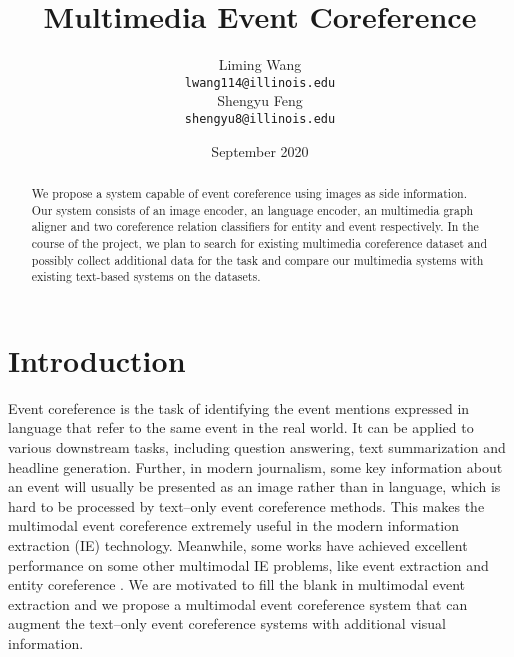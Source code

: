 \documentclass[11pt,a4paper]{article}
\title{Multimedia Event Coreference}
\author{Liming Wang\\
\texttt{lwang114@illinois.edu}\\\And
Shengyu Feng\\
\texttt{shengyu8@illinois.edu}\\
}
\date{September 2020}
\newcommand{\bx}{\mathbf{x}}
\newcommand{\cD}{\mathcal{D}}
\begin{document}
\maketitle

\begin{abstract}
We propose a system capable of event coreference using images as side information. Our system consists of an image encoder, an language encoder, an multimedia graph aligner and two coreference relation classifiers for entity and event respectively. In the course of the project, we plan to search for existing multimedia coreference dataset and possibly collect additional data for the task and compare our multimedia systems with existing text-based systems on the datasets.  
\end{abstract}

\section{Introduction}
Event coreference is the task of identifying the event mentions expressed in language that refer to the same event in the real world. It can be applied to various downstream tasks, including question answering, text summarization and headline generation. Further, in modern journalism, some key information about an event will usually be presented as an image rather than in language, which is hard to be processed by text--only event coreference methods. This makes the multimodal event coreference extremely useful in the modern information extraction (IE) technology. Meanwhile, some works have achieved excellent performance on some other multimodal IE problems, like event extraction and entity coreference \cite{Li2020-crossmedia-ie}. We are motivated to fill the blank in multimodal event extraction and we propose a multimodal event coreference system that can augment the text--only event coreference systems with additional visual information.
\end{document}
